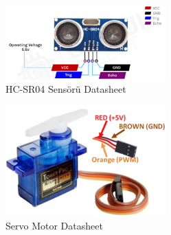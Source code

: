 \begin{figure}[H]
\centering
\includegraphics[width=0.55\textwidth]{Resimler/18.png}
\caption{HC-SR04 Sensörü Datasheet}
\label{fig:18}
\end{figure}

\begin{figure}[H]
\centering
\includegraphics[width=0.55\textwidth]{Resimler/21.png}
\caption{Servo Motor Datasheet}
\label{fig:21}
\end{figure}
